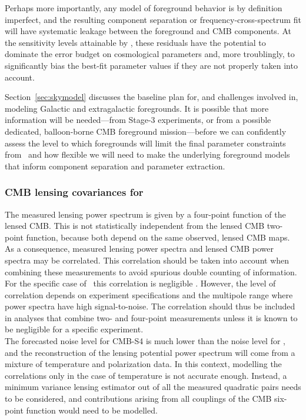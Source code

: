 Perhaps more importantly, 
any model of foreground behavior is by definition imperfect, and the resulting component separation
or frequency-cross-spectrum fit will have systematic leakage between the foreground and CMB components.
At the sensitivity levels attainable by \cmbexp, these residuals have the potential to dominate the
error budget on cosmological parameters and, more troublingly, to significantly bias the best-fit 
parameter values if they are not properly taken into account.

Section~\ref{sec:skymodel} discusses the baseline plan for, and challenges involved in, modeling
Galactic and extragalactic foregrounds. It is possible that more information will be needed---from 
Stage-3 experiments, or from a possible dedicated, balloon-borne CMB foreground mission---before
we can confidently assess the level to which foregrounds will limit the final parameter constraints
from \cmbexp\ and how flexible we will need to make the underlying foreground models that 
inform component separation and parameter extraction. 

\subsubsection{CMB lensing covariances for \cmbexp }
\label{se:covs}

The measured lensing power spectrum is given by a four-point function of the lensed CMB. 
This is not statistically independent from the lensed CMB two-point function, because both depend on the same observed, lensed CMB maps. 
As a consequence, measured lensing power spectra and lensed CMB power spectra may be correlated. 
This correlation should be taken into account when combining these measurements to avoid spurious double counting of information. 
For the specific case of \planck\ this correlation is negligible \cite{Schmittfull:2013uea}. 
However, the level of correlation depends on experiment specifications and the multipole range where power spectra have high signal-to-noise. 
The correlation should thus be included in analyses that combine two- and four-point measurements unless it is known to be negligible for a specific experiment.
\\

The forecasted noise level for CMB-S4 is much lower than the noise level for \planck, and the reconstruction of the lensing potential power spectrum will come from a mixture of temperature and polarization data.
In this context, modelling the correlations only in the case of temperature is not accurate enough.
Instead, a minimum variance lensing estimator out of all the measured quadratic pairs needs to be considered, and contributions arising from all couplings of the CMB six-point function would need to be modelled.
\\

